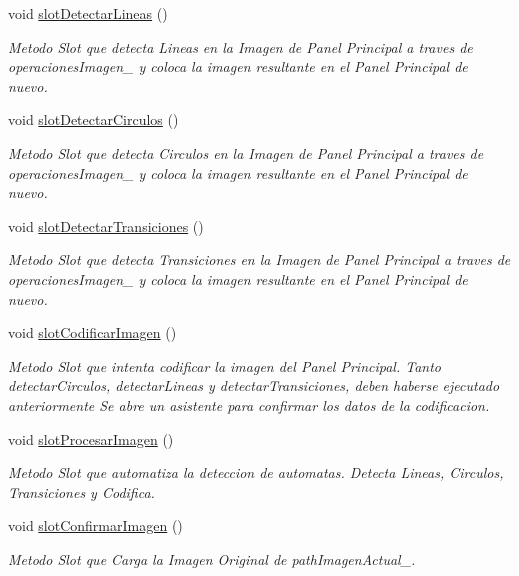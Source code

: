 \begin{DoxyCompactItemize}
void \hyperlink{classCAplicacion_aa7e195e4f06c864cb7c45e626d081b1c}{slot\+Detectar\+Lineas} ()
\begin{DoxyCompactList}\small\item\em Metodo Slot que detecta Lineas en la Imagen de Panel Principal a traves de operaciones\+Imagen\+\_\+ y coloca la imagen resultante en el Panel Principal de nuevo. \end{DoxyCompactList}\item 
void \hyperlink{classCAplicacion_af8fa414d46ce7a61ab9c3d19ee18a7c1}{slot\+Detectar\+Circulos} ()
\begin{DoxyCompactList}\small\item\em Metodo Slot que detecta Circulos en la Imagen de Panel Principal a traves de operaciones\+Imagen\+\_\+ y coloca la imagen resultante en el Panel Principal de nuevo. \end{DoxyCompactList}\item 
void \hyperlink{classCAplicacion_a02f4c3cd425565a9c675a10a5d9b0954}{slot\+Detectar\+Transiciones} ()
\begin{DoxyCompactList}\small\item\em Metodo Slot que detecta Transiciones en la Imagen de Panel Principal a traves de operaciones\+Imagen\+\_\+ y coloca la imagen resultante en el Panel Principal de nuevo. \end{DoxyCompactList}\item 
void \hyperlink{classCAplicacion_a87253da47e41e28e7bb911b39a885cd7}{slot\+Codificar\+Imagen} ()
\begin{DoxyCompactList}\small\item\em Metodo Slot que intenta codificar la imagen del Panel Principal. Tanto detectar\+Circulos, detectar\+Lineas y detectar\+Transiciones, deben haberse ejecutado anteriormente Se abre un asistente para confirmar los datos de la codificacion. \end{DoxyCompactList}\item 
void \hyperlink{classCAplicacion_a8855c72841e3b45c0873b9ee009df523}{slot\+Procesar\+Imagen} ()
\begin{DoxyCompactList}\small\item\em Metodo Slot que automatiza la deteccion de automatas. Detecta Lineas, Circulos, Transiciones y Codifica. \end{DoxyCompactList}\item 
void \hyperlink{classCAplicacion_af1d9066e196cd66a1967ff5a79e6a8d8}{slot\+Confirmar\+Imagen} ()
\begin{DoxyCompactList}\small\item\em Metodo Slot que Carga la Imagen Original de path\+Imagen\+Actual\+\_\+. \end{DoxyCompactList}\item 

\end{DoxyCompactItemize}
